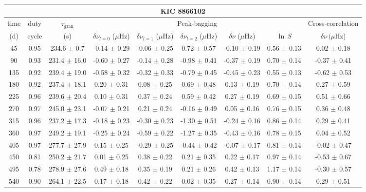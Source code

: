 \documentclass[twocolumn]{aastex61}%
\begin{document}
\begin{table*}[ht]\centering\fontsize{9.}{7.}\selectfont
\begin{tabular}{ccc|ccccc|c}
\multicolumn{9}{c}{KIC 8866102}\\ \hline\hline
time & duty & $\tau_\text{gran}$ &\multicolumn{5}{c|}{Peak-bagging}&Cross-correlation\\
(d)& cycle & (s)&$\delta\nu_{l=0}$ ($\mu$Hz) & $\delta\nu_{l=1}$ ($\mu$Hz) & $\delta\nu_{l=2}$ ($\mu$Hz) & $\delta\nu$ ($\mu$Hz)& $\ln\,S$ & $\delta\nu\,(\mu$Hz)\\\hline
45 & 0.95 & 234.6 $\pm$ 0.7 & -0.14 $\pm$ 0.29 & -0.06 $\pm$ 0.25 & 0.72 $\pm$ 0.57 & -0.10 $\pm$ 0.19 & 0.56 $\pm$ 0.13 & 0.02 $\pm$ 0.18\\
90 & 0.93 & 231.4 $\pm$ 16.0 & -0.60 $\pm$ 0.27 & -0.14 $\pm$ 0.28 & -0.98 $\pm$ 0.41 & -0.37 $\pm$ 0.19 & 0.70 $\pm$ 0.14 & -0.37 $\pm$ 0.41\\
135 & 0.92 & 239.4 $\pm$ 19.0 & -0.58 $\pm$ 0.32 & -0.32 $\pm$ 0.33 & -0.79 $\pm$ 0.45 & -0.45 $\pm$ 0.23 & 0.55 $\pm$ 0.13 & -0.62 $\pm$ 0.53\\
180 & 0.92 & 237.4 $\pm$ 18.1 & 0.20 $\pm$ 0.31 & 0.08 $\pm$ 0.25 & 0.69 $\pm$ 0.48 & 0.13 $\pm$ 0.19 & 0.70 $\pm$ 0.14 & 0.27 $\pm$ 0.59\\
225 & 0.96 & 239.6 $\pm$ 20.4 & 0.10 $\pm$ 0.31 & 0.37 $\pm$ 0.24 & 0.59 $\pm$ 0.42 & 0.27 $\pm$ 0.19 & 0.69 $\pm$ 0.15 & 0.51 $\pm$ 0.66\\
270 & 0.97 & 245.0 $\pm$ 23.1 & -0.07 $\pm$ 0.21 & 0.21 $\pm$ 0.24 & -0.16 $\pm$ 0.49 & 0.05 $\pm$ 0.16 & 0.76 $\pm$ 0.15 & 0.36 $\pm$ 0.48\\
315 & 0.96 & 237.2 $\pm$ 17.3 & -0.18 $\pm$ 0.23 & -0.30 $\pm$ 0.23 & -1.30 $\pm$ 0.51 & -0.24 $\pm$ 0.16 & 0.86 $\pm$ 0.14 & 0.29 $\pm$ 0.41\\
360 & 0.97 & 249.2 $\pm$ 19.1 & -0.25 $\pm$ 0.24 & -0.59 $\pm$ 0.22 & -1.27 $\pm$ 0.35 & -0.43 $\pm$ 0.16 & 0.78 $\pm$ 0.15 & 0.04 $\pm$ 0.52\\
405 & 0.97 & 277.7 $\pm$ 27.9 & 0.15 $\pm$ 0.25 & -0.29 $\pm$ 0.25 & -0.44 $\pm$ 0.42 & -0.07 $\pm$ 0.17 & 0.81 $\pm$ 0.14 & -0.02 $\pm$ 0.47\\
450 & 0.81 & 250.2 $\pm$ 21.7 & 0.01 $\pm$ 0.25 & 0.38 $\pm$ 0.22 & 0.21 $\pm$ 0.35 & 0.22 $\pm$ 0.17 & 0.97 $\pm$ 0.14 & -0.53 $\pm$ 0.67\\
495 & 0.78 & 278.9 $\pm$ 27.6 & 0.49 $\pm$ 0.18 & 0.35 $\pm$ 0.19 & 0.21 $\pm$ 0.26 & 0.42 $\pm$ 0.13 & 1.17 $\pm$ 0.14 & -0.30 $\pm$ 0.57\\
540 & 0.90 & 264.1 $\pm$ 22.5 & 0.17 $\pm$ 0.18 & 0.42 $\pm$ 0.22 & 0.02 $\pm$ 0.35 & 0.27 $\pm$ 0.14 & 0.90 $\pm$ 0.14 & 0.29 $\pm$ 0.51\\

\end{tabular}
\end{table*}
\end{document}
